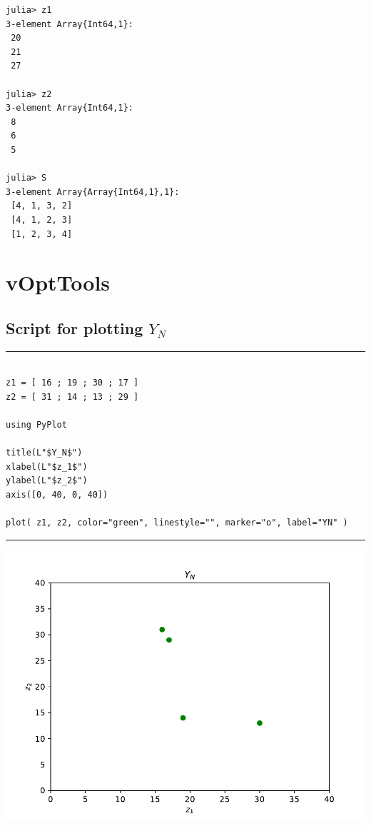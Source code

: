 \documentclass[11pt]{article}
\begin{document}
\begin{verbatim}
julia> z1
3-element Array{Int64,1}:
 20
 21
 27

julia> z2
3-element Array{Int64,1}:
 8
 6
 5

julia> S
3-element Array{Array{Int64,1},1}:
 [4, 1, 3, 2]
 [4, 1, 2, 3]
 [1, 2, 3, 4]
\end{verbatim}

\break

%
%
\section{vOptTools}

\subsection{Script for plotting $Y_N$}
\vspace{5mm}  \vspace{2mm} \hrule

{%
\begin{lstlisting}

z1 = [ 16 ; 19 ; 30 ; 17 ]
z2 = [ 31 ; 14 ; 13 ; 29 ]
 
using PyPlot

title(L"$Y_N$")
xlabel(L"$z_1$")
ylabel(L"$z_2$")
axis([0, 40, 0, 40])

plot( z1, z2, color="green", linestyle="", marker="o", label="YN" )
\end{lstlisting}
}

\vspace{5mm}  \vspace{2mm} \hrule
\begin{center}
  \includegraphics[scale=0.75]{figplot.pdf}
  \end{center}
\end{document}
